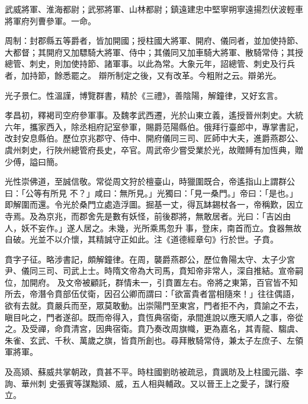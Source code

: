 \begin{pinyinscope}
 武威將軍、淮海都尉；武邪將軍、山林都尉；鎮遠建忠中堅寧朔寧遠揚烈伏波輕車將軍府列曹參軍。一命。



 周制：封郡縣五等爵者，皆加開國；授柱國大將軍、開府、儀同者，並加使持節、大都督；其開府又加驃騎大將軍、侍中；其儀同又加車騎大將軍、散騎常侍；其授總管、刺史，則加使持節、諸軍事。以此為常。大象元年，詔總管、刺史及行兵者，加持節，餘悉罷之。
 辯所制定之後，又有改革。今粗附之云。辯弟光。



 光子景仁。性溫謹，博覽群書，精於《三禮》，善陰陽，解鐘律，又好玄言。



 孝昌初，釋褐司空府參軍事。及魏孝武西遷，光於山東立義，遙授晉州刺史。大統六年，攜家西入，除丞相府記室參軍，賜爵范陽縣伯。俄拜行臺郎中，專掌書記，改封安息縣伯。歷位京兆郡守、侍中、開府儀同三司、匠師中大夫，進爵燕郡公、虞州刺史，行陜州總管府長史，卒官。周武帝少嘗受業於光，故贈賻有加恆典，贈少傅，謚曰簡。



 光性崇佛道，至誠信敬。常從周文狩於檀臺山，時獵圍既合，帝遙指山上謂群公曰：「公等有所見
 不？」咸曰：無所見。」光獨曰：「見一桑門。」帝曰：「是也。」即解圍而還。令光於桑門立處造浮圖。掘基一丈，得瓦缽錫杖各一，帝稱歎，因立寺焉。及為京兆，而郡舍先是數有妖怪，前後郡將，無敢居者。光曰：「吉凶由人，妖不妄作。」遂人居之。未幾，光所乘馬忽升事，登床，南首而立。食器無故自破。光並不以介懷，其精誠守正如此。注《道德經章句》行於世。子賁。



 賁字子征。略涉書記，頗解鐘律。在周，襲爵燕郡公，歷位魯陽太守、太子少宮尹、儀同三司、司武上士。時隋文帝為大司馬，賁知帝非常人，深自推結。宣帝嗣位，加開府。
 及文帝被顧託，群情未一，引賁置左右。帝將之東第，百官皆不知所去，帝潛令賁部伍仗衛，因召公卿而謂曰：「欲富貴者當相隨來！」往往偶語，欲有去就。賁嚴兵而至，眾莫敢動。出崇陽門至東宮，門者拒不內，賁諭之不去，瞋目叱之，門者遂卻。既而帝得入，賁恆典宿衛，承間進說以應天順人之事，帝從之。及受禪，命賁清宮，因典宿衛。賁乃奏改周旗幟，更為嘉名，其青龍、騶虞、朱雀、玄武、千秋、萬歲之旗，皆賁所創也。尋拜散騎常侍，兼太子左庶子、左領軍將軍。



 及高熲、蘇威共掌朝政，賁甚不平。時柱國劉昉被疏忌，賁諷昉及上柱國元諧、李詢、華州刺
 史張賓等謀黜熲、威，五人相與輔政。又以晉王上之愛子，謀行廢立。




\end{pinyinscope}
